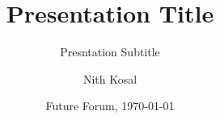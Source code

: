 \documentclass[11pt]{beamer}
\begin{document}
	\author[Nith Kosal]{Nith Kosal}
	\title[Presentation Title]{Presentation Title}
	\subtitle{Presntation Subtitle}
	\date{Future Forum, \today}
	\begin{frame}[plain]
		\maketitle
	\end{frame}
	
	\begin{frame}
		\frametitle{}
	\end{frame}
\end{document}
